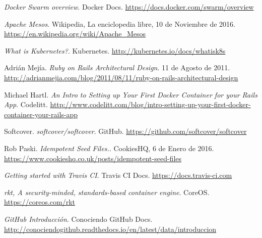 \begin{thebibliography}{9}
\textit{Docker Swarm overview}. 
Docker Docs.
\url{https://docs.docker.com/swarm/overview}

\textit{Apache Mesos}. 
Wikipedia, La enciclopedia libre, 10 de Noviembre de 2016.
\url{https://en.wikipedia.org/wiki/Apache\_Mesos}

\textit{What is Kubernetes?}. 
Kubernetes.
\url{http://kubernetes.io/docs/whatisk8s}

Adrián Mejía.
\textit{Ruby on Rails Architectural Design}. 
11 de Agosto de 2011.
\url{http://adrianmejia.com/blog/2011/08/11/ruby-on-rails-architectural-design}

Michael Hartl.
\textit{An Intro to Setting up Your First Docker Container for your Rails App}. 
Codelitt.
\url{http://www.codelitt.com/blog/intro-setting-up-your-first-docker-container-your-rails-app}

Softcover.
\textit{softcover/softcover}. GitHub.
\url{https://github.com/softcover/softcover}

Rob Paski.
\textit{Idempotent Seed Files.}. 
CookiesHQ, 6 de Enero de 2016.
\url{https://www.cookieshq.co.uk/posts/idempotent-seed-files}

\textit{Getting started with Travis CI}. 
Travis CI Docs.
\url{https://docs.travis-ci.com}

\textit{rkt, A security-minded, standards-based container engine}. 
CoreOS.
\url{https://coreos.com/rkt}

\textit{GitHub Introducción}. 
Conociendo GitHub Docs.
\url{http://conociendogithub.readthedocs.io/en/latest/data/introduccion}

\end{thebibliography}


